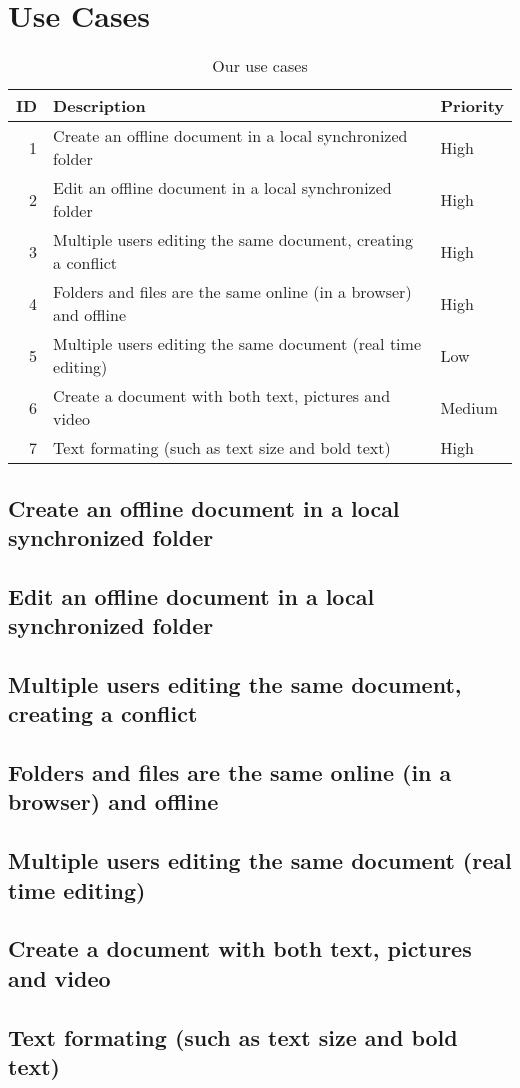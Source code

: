 \section{Use Cases}
\begin{table*}[ht]\centering
  \begin{tabularx}{\textwidth}{@{}rXl@{}}\toprule
    \textbf{ID} & \textbf{Description} & \textbf{Priority} \\\hline
    1
    & Create an offline document in a local synchronized folder
    & High \\\hline
    2 
    & Edit an offline document in a local synchronized folder
    & High \\\hline
    3 
    & Multiple users editing the same document, creating a conflict
    & High \\\hline
    4 
    & Folders and files are the same online (in a browser) and offline
    & High \\\hline
    5 
    & Multiple users editing the same document (real time editing)
    & Low \\\hline
    6 
    & Create a document with both text, pictures and video
	& Medium \\\hline
    7 
    & Text formating (such as text size and bold text)
    & High \\
    \bottomrule
  \end{tabularx}
  \caption{Our use cases}
  \label{usecases}\centering%
\end{table*}

\subsection{Create an offline document in a local synchronized folder}
\subsection{Edit an offline document in a local synchronized folder}
\subsection{Multiple users editing the same document, creating a conflict}
\subsection{Folders and files are the same online (in a browser) and offline}
\subsection{Multiple users editing the same document (real time editing)}
\subsection{Create a document with both text, pictures and video}
\subsection{Text formating (such as text size and bold text)}

\newpage